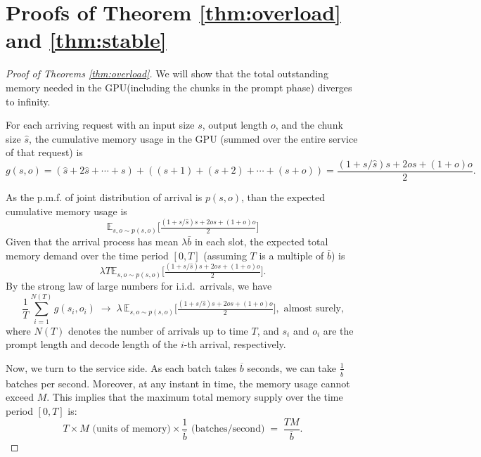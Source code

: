 \documentclass{article}
\theoremstyle{plain}
\newtheorem{theorem}{Theorem}[section]
\theoremstyle{definition}
\theoremstyle{remark}
\begin{document}



\appendix
\onecolumn 


\section{Proofs of Theorem \ref{thm:overload} and \ref{thm:stable}}
 \label{sec:proof}

\begin{proof}[Proof of Theorems \ref{thm:overload}]
We will show that the total outstanding memory needed in the GPU(including the chunks in the prompt phase) diverges to infinity.

For each arriving request with an input size \(s\), output length \(o\), and the chunk size \(\hat{s}\), the cumulative memory usage in the GPU (summed over the entire service of that request) is
\[
g(s,o)=(\hat{s}+2\hat{s}+\cdots+s)+((s+1)+(s+2)+\cdots+(s+o)) = \frac{(1+s/\hat{s})s+2os+(1+o)o}{2}.
\]

As the p.m.f. of joint distribution of arrival is $p(s,o)$, than the expected cumulative memory usage is 
\[
   \mathbb{E}_{s,o\sim p(s,o)}\Big[\tfrac{(1+s/\hat{s})s+2os+(1+o)o}{2}\Big] 
\]
Given that the arrival process has mean $\lambda \bar b$ in each slot, the expected total memory demand over the time period $[0,T]$ (assuming $T$ is a multiple of $\bar b$) is
\[
   \lambda T\mathbb{E}_{s,o\sim p(s,o)}\Big[\tfrac{(1+s/\hat{s})s+2os+(1+o)o}{2}\Big]. 
\]
By the strong law of large numbers for i.i.d.\ arrivals, we have
\begin{equation}
\frac{1}{T}\sum_{i=1}^{N(T)} g(s_i,o_i)
\;\rightarrow\;
\lambda \,\mathbb{E}_{s,o\sim p(s,o)}
\Big[\tfrac{(1+s/\hat{s})s+2os+(1+o)o}{2}\Big], \text{ almost surely,}
\label{LLN}
\end{equation}
where $N(T)$ denotes the number of arrivals up to time $T$, and
$s_i$ and $o_i$ are the prompt length and decode length of the $i$-th
arrival, respectively.

Now, we turn to the service side. As each batch takes \(\overline{b}\) seconds, we can take \(\tfrac{1}{\overline{b}}\) batches per second.  
Moreover, at any instant in time, the memory usage cannot exceed \(M\). This implies that the maximum total memory supply over the time period $[0,T]$  is:
\[
   T\times M
\text{ (units of memory)} 
   \times
   \frac{1}{\overline{b}}
\text{ (batches/second)}
   \;=\;
   \frac{TM}{\,\overline{b}\,}.
\]


\end{proof}
\end{document}
